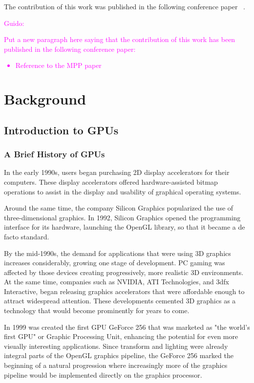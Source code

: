 \documentclass[Ingles]{ic-tese-v1}
\newcommand{\guido}[1]{\noindent\textcolor{magenta}{Guido: {#1}}}
\newcommand{\guido}[1]{}
\begin{document}
The contribution of this work was published in the following conference paper ~\cite{maicol2017}.

\guido{Put a new paragraph here saying that the contribution of this work has been
published in the following conference paper:
\begin{itemize}
\item Reference to the MPP paper
\end{itemize}}

\chapter{Background}
\label{cap:background}

\section{Introduction to GPUs}
\subsection{A Brief History of GPUs}
In the early 1990s, users began purchasing
2D display accelerators for their computers. These display accelerators
offered hardware-assisted bitmap operations to assist in the display and usability
of graphical operating systems.

Around the same time, the company Silicon Graphics popularized the use
of three-dimensional graphics. In 1992, Silicon Graphics opened the
programming interface for its hardware, launching the OpenGL library, so that it became a de facto standard.

By the mid-1990s, the demand for applications that were using 3D graphics
increases considerably, growing one stage of development. PC gaming was affected
by those devices creating progressively, more realistic 3D environments.
At the same time, companies such as NVIDIA, ATI Technologies,
and 3dfx Interactive, began releasing graphics accelerators that were affordable
enough to attract widespread attention. These developments cemented 3D
graphics as a technology that would become prominently for years to come.

In 1999 was created the first GPU GeForce 256 that was marketed as "the world's
first GPU" or Graphic Processing Unit, enhancing the potential
for even more visually interesting applications. Since transform and lighting were
already integral parts of the OpenGL graphics pipeline, the GeForce 256 marked
the beginning of a natural progression where increasingly more of the graphics
pipeline would be implemented directly on the graphics processor.
\end{document}
